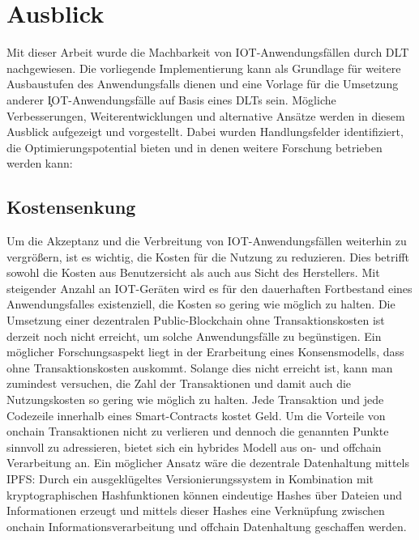 \chapter{Ausblick}
\label{ch:perspective}
Mit dieser Arbeit wurde die Machbarkeit von \ac{IOT}-Anwendungsfällen durch \ac{DLT} nachgewiesen. Die vorliegende Implementierung kann als Grundlage für weitere Ausbaustufen des Anwendungsfalls dienen und eine Vorlage für die Umsetzung anderer \c{IOT}-Anwendungsfälle auf Basis eines \acp{DLT} sein. Mögliche Verbesserungen, Weiterentwicklungen und alternative Ansätze werden in diesem Ausblick aufgezeigt und vorgestellt. Dabei wurden Handlungsfelder identifiziert, die Optimierungspotential bieten und in denen weitere Forschung betrieben werden kann:\\


\section{Kostensenkung}
\label{sec:perspective:costs}
Um die Akzeptanz und die Verbreitung von \ac{IOT}-Anwendungsfällen weiterhin zu vergrößern, ist es wichtig, die Kosten für die Nutzung zu reduzieren. Dies betrifft sowohl die Kosten aus Benutzersicht als auch aus Sicht des Herstellers. Mit steigender Anzahl an \ac{IOT}-Geräten wird es für den dauerhaften Fortbestand eines Anwendungsfalles existenziell, die Kosten so gering wie möglich zu halten. Die Umsetzung einer dezentralen Public-Blockchain ohne Transaktionskosten ist derzeit noch nicht erreicht, um solche Anwendungsfälle zu begünstigen. Ein möglicher Forschungsaspekt liegt in der Erarbeitung eines Konsensmodells, dass ohne Transaktionskosten auskommt. Solange dies nicht erreicht ist, kann man zumindest versuchen, die Zahl der Transaktionen und damit auch die Nutzungskosten so gering wie möglich zu halten. Jede Transaktion und jede Codezeile innerhalb eines Smart-Contracts kostet Geld. Um die Vorteile von onchain Transaktionen nicht zu verlieren und dennoch die genannten Punkte sinnvoll zu adressieren, bietet sich ein hybrides Modell aus on- und offchain Verarbeitung an. Ein möglicher Ansatz wäre die dezentrale Datenhaltung mittels \ac{IPFS}: Durch ein ausgeklügeltes Versionierungssystem in Kombination mit kryptographischen Hashfunktionen können eindeutige Hashes über Dateien und Informationen erzeugt und mittels dieser Hashes eine Verknüpfung zwischen onchain Informationsverarbeitung und offchain Datenhaltung geschaffen werden.\\
